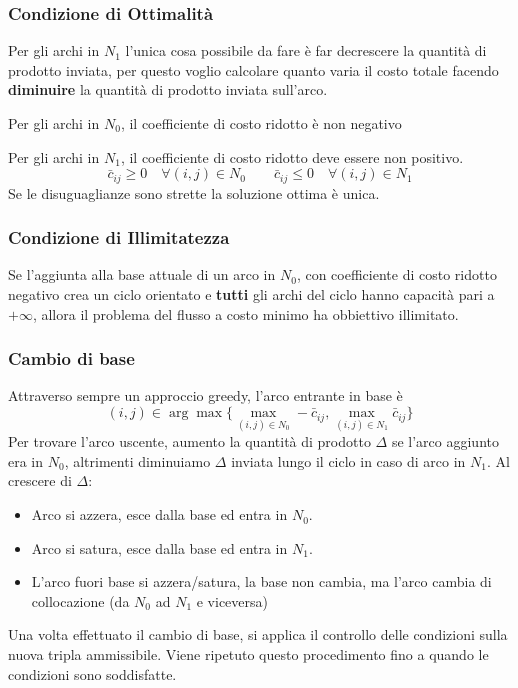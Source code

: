 \documentclass[../template]{subfiles}
\begin{document}
\subsubsection{Condizione di Ottimalità}
Per gli archi in $N_1$ l'unica cosa possibile da fare è far decrescere la quantità di prodotto inviata, per questo voglio
calcolare quanto varia il costo totale facendo \textbf{diminuire} la quantità di prodotto inviata sull'arco.

Per gli archi in $N_0$, il coefficiente di costo ridotto è non negativo

Per gli archi in $N_1$, il coefficiente di costo ridotto deve essere non positivo.
\[
    \bar{c}_{ij} \ge 0 \quad \forall (i, j) \in N_0  \qquad \bar{c}_{ij} \le 0 \quad \forall (i, j) \in N_1
\]
Se le disuguaglianze sono strette la soluzione ottima è unica.
\subsubsection{Condizione di Illimitatezza}
Se l'aggiunta alla base attuale di un arco in $N_0$, con coefficiente di costo ridotto negativo crea un ciclo orientato
e \textbf{tutti} gli archi del ciclo hanno capacità pari a $+\infty$, allora il problema del flusso a costo minimo ha obbiettivo
illimitato.

\subsubsection{Cambio di base}
Attraverso sempre un approccio greedy, l'arco entrante in base è
\[
    (i, j) \in \arg\max\big\{ \max_{(i, j) \in N_0} -\bar{c}_{ij}, \max_{(i, j) \in N_1} \bar{c}_{ij}\big\}
\]
Per trovare l'arco uscente, aumento la quantità di prodotto $\Delta$ se l'arco aggiunto era in $N_0$, altrimenti diminuiamo
$\Delta$ inviata lungo il ciclo in caso di arco in $N_1$.
Al crescere di $\Delta$:
\begin{itemize}
    \item Arco si azzera, esce dalla base ed entra in $N_0$.
    \item Arco si satura, esce dalla base ed entra in $N_1$.
    \item L'arco fuori base si azzera/satura, la base non cambia, ma l'arco cambia di collocazione (da $N_0$ ad $N_1$ e viceversa)
\end{itemize}
Una volta effettuato il cambio di base, si applica il controllo delle condizioni sulla nuova tripla ammissibile.
Viene ripetuto questo procedimento fino a quando le condizioni sono soddisfatte.
\end{document}
